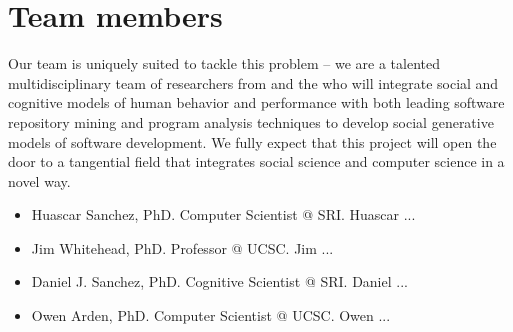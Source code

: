 \section{Team members}
\label{sec:team}
Our team is uniquely suited to tackle this problem -- we are a talented
multidisciplinary team of researchers from \SRI and the \UCSC who will integrate
social and cognitive models of human behavior and performance with both leading
software repository mining and program analysis techniques to develop social
generative models of software development. We fully expect that this project
will open the door to a tangential field that integrates social science and
computer science in a novel way.

\begin{itemize}
  \addtolength{\itemindent}{3.9mm}
  \item Huascar Sanchez, PhD. Computer Scientist @ SRI.  Huascar ...
  \item Jim Whitehead, PhD. Professor @ UCSC.  Jim ...
  \item Daniel J. Sanchez, PhD. Cognitive Scientist @ SRI.  Daniel ...
  \item Owen Arden, PhD. Computer Scientist @ UCSC. Owen ...
\end{itemize}
